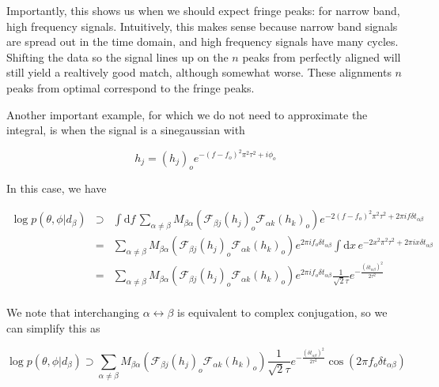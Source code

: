 \documentclass[10pt]{article}
\begin{document}
Importantly, this shows us when we should expect fringe peaks: for narrow band, high frequency signals. Intuitively, this makes sense because narrow band signals are spread out in the time domain, and high frequency signals have many cycles. Shifting the data so the signal lines up on the $n$ peaks from perfectly aligned will still yield a realtively good match, although somewhat worse. These alignments $n$ peaks from optimal correspond to the fringe peaks.

Another important example, for which we do not need to approximate the integral, is when the signal is a sinegaussian with

\begin{equation}
h_j = \left(h_j\right)_o e^{-(f-f_o)^2 \pi^2 \tau^2 + i\phi_o}
\end{equation}

In this case, we have

\begin{eqnarray}
\log p(\theta,\phi|d_\beta) & \supset & \int\mathrm{d}f\,\sum\limits_{\alpha\neq\beta} M_{\beta\alpha} \left(\mathcal{F}_{\beta j}\left(h_j\right)_o \mathcal{F}_{\alpha k}\left(h_k\right)_o \right)e^{-2(f-f_o)^2\pi^2\tau^2+2\pi i f \delta t_{\alpha\beta}} \\
& = & \sum\limits_{\alpha\neq\beta} M_{\beta\alpha} \left(\mathcal{F}_{\beta j}\left(h_j\right)_o \mathcal{F}_{\alpha k}\left(h_k\right)_o \right) e^{2\pi i f_o \delta t_{\alpha\beta}}\int\mathrm{d}x\, e^{-2x^2\pi^2\tau^2+2\pi i x \delta t_{\alpha\beta}} \\
& = & \sum\limits_{\alpha\neq\beta} M_{\beta\alpha} \left(\mathcal{F}_{\beta j}\left(h_j\right)_o \mathcal{F}_{\alpha k}\left(h_k\right)_o \right) e^{2\pi i f_o \delta t_{\alpha\beta}}\frac{1}{\sqrt{2}\tau} e^{-\frac{(\delta t_{\alpha\beta})^2}{2\tau^2}} \\
\end{eqnarray}

We note that interchanging $\alpha\leftrightarrow\beta$ is equivalent to complex conjugation, so we can simplify this as

\begin{equation}
\log p(\theta,\phi|d_\beta) \supset \sum\limits_{\alpha\neq\beta} M_{\beta\alpha} \left(\mathcal{F}_{\beta j}\left(h_j\right)_o \mathcal{F}_{\alpha k}\left(h_k\right)_o \right) \frac{1}{\sqrt{2}\tau} e^{-\frac{(\delta t_{\alpha\beta})^2}{2\tau^2}} \cos\left( 2\pi f_o \delta t_{\alpha\beta} \right)
\end{equation}
\end{document}
